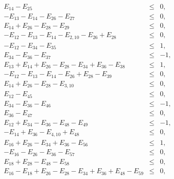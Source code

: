 \documentclass[%
 showpacs,
 showkeys,
 preprintnumbers,
 amsmath,amssymb,
 aps,
  pra,
  longbibliography,
 floatfix,
 ]{revtex4-1}
\begin{document}
\begin{eqnarray}
 E_{14} - E_{25} &\le&  0,                                                                                   \\
-E_{13} - E_{14} - E_{26} - E_{27} &\le&  0,                                                                 \\
 E_{14} + E_{26} - E_{28} - E_{29} &\le&  0,                                                                 \\
-E_{12} - E_{13} - E_{14} - E_{2,10} - E_{26} + E_{28} &\le&    0,                                           \\
-E_{12} - E_{34} - E_{35} &\le&  1,                                                                          \\
 E_{34} - E_{36} - E_{37} &\le&  -1,                                                                         \\
 E_{13} + E_{14} + E_{26} - E_{28} - E_{34} + E_{36} - E_{38} &\le&   1,                                     \\
-E_{12} - E_{13} - E_{14} - E_{26} + E_{28} - E_{39} &\le&  0,                                               \\
 E_{14} + E_{26} - E_{28} - E_{3,10} &\le&  0,                                                               \\
 E_{12} - E_{45} &\le&  0,                                                                                   \\
 E_{34} - E_{36} - E_{46} &\le&  -1,                                                                         \\
 E_{36} - E_{47} &\le&  0,                                                                                   \\
 E_{12} + E_{34} - E_{36} - E_{48} - E_{49} &\le&  -1,                                                       \\
-E_{14} + E_{36} - E_{4,10} + E_{48} &\le&  0,                                                               \\
 E_{16} + E_{26} - E_{34} + E_{36} - E_{56} &\le&  1,                                                        \\
-E_{16} - E_{26} - E_{36} - E_{57} &\le&  0,                                                                 \\
 E_{18} + E_{28} - E_{48} - E_{58} &\le&  0,                                                                 \\
 E_{16} - E_{18} + E_{26} - E_{28} - E_{34} + E_{36} + E_{48} - E_{59} &\le&   0,                            \\

\end{eqnarray}
\end{document}
